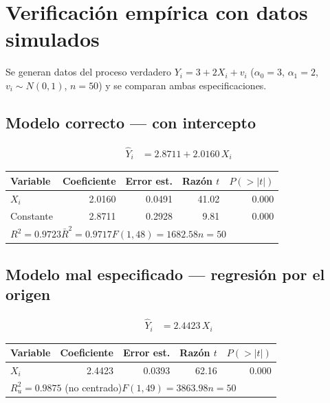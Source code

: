 \documentclass[12pt, letterpaper]{article}
\begin{document}
\section{Verificación empírica con datos simulados}

Se generan datos del proceso verdadero $Y_i = 3 + 2X_i + v_i$
($\alpha_0 = 3$, $\alpha_1 = 2$, $v_i \sim N(0,1)$, $n = 50$) y se
comparan ambas especificaciones.

\subsection{Modelo correcto --- con intercepto}

\begin{align}
  \widehat{Y}_i &= 2.8711 + 2.0160\,X_i
\end{align}

\begin{center}
\renewcommand{\arraystretch}{1.3}
\small
\begin{tabular}{lrrrr}
\toprule
\textbf{Variable} & \textbf{Coeficiente} & \textbf{Error est.} & \textbf{Razón $t$} & \textbf{$P(>|t|)$} \\
\midrule
$X_i$      &  2.0160 & 0.0491 &  41.02 & 0.000 \\
Constante  &  2.8711 & 0.2928 &   9.81 & 0.000 \\
\midrule
\multicolumn{5}{l}{$R^2 = 0.9723$\quad $\bar{R}^2 = 0.9717$\quad $F(1,48) = 1682.58$\quad $n = 50$} \\
\bottomrule
\end{tabular}
\end{center}

\subsection{Modelo mal especificado --- regresión por el origen}

\begin{align}
  \widehat{Y}_i &= 2.4423\,X_i
\end{align}

\begin{center}
\renewcommand{\arraystretch}{1.3}
\small
\begin{tabular}{lrrrr}
\toprule
\textbf{Variable} & \textbf{Coeficiente} & \textbf{Error est.} & \textbf{Razón $t$} & \textbf{$P(>|t|)$} \\
\midrule
$X_i$  &  2.4423 & 0.0393 & 62.16 & 0.000 \\
\midrule
\multicolumn{5}{l}{$R^2_u = 0.9875$ (no centrado)\quad $F(1,49) = 3863.98$\quad $n = 50$} \\
\bottomrule
\end{tabular}
\end{center}
\end{document}

